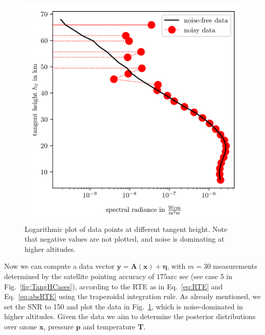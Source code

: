
\begin{figure}[th!]
	\centering
	\includegraphics{DataPlot.png}
	\caption[Logarithmic plot of data points at different tangent height.]{Logarithmic plot of data points at different tangent height. Note that negative values are not plotted, and noise is dominating at higher altitudes.}
	\label{fig:DataPlot}
\end{figure}

Now we can compute a data vector $\bm{y} = \bm{A}(\bm{x}) + \bm{\eta} $, with $m = 30$ measurements determined by the satellite pointing accuracy of $175\text{arc sec}$ (see case 5 in Fig.~\ref{fig:TangHCases}), according to the RTE as in Eq.~\ref{eq:RTE} and Eq.~\ref{eq:absRTE} using the trapezoidal integration rule.
As already mentioned, we set the SNR to 150 and plot the data in Fig.~\ref{fig:DataPlot}, which is noise-dominated in higher altitudes.
Given the data we aim to determine the posterior distributions over ozone $\bm{x}$, pressure $\bm{p}$ and temperature $\bm{T}$.
\clearpage
